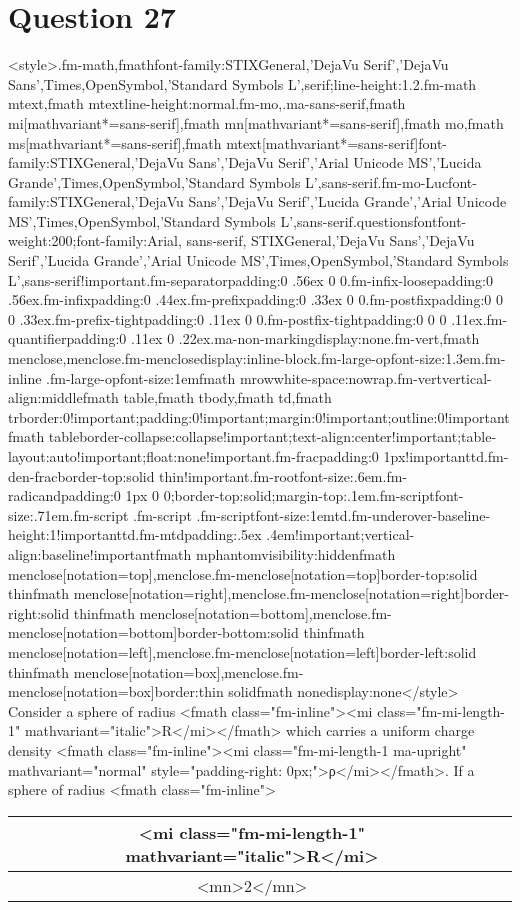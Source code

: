 \documentclass{article}
\begin{document}
\section*{Question 27}
<style>.fm-math,fmath{font-family:STIXGeneral,'DejaVu Serif','DejaVu Sans',Times,OpenSymbol,'Standard Symbols L',serif;line-height:1.2}.fm-math mtext,fmath mtext{line-height:normal}.fm-mo,.ma-sans-serif,fmath mi[mathvariant*=sans-serif],fmath mn[mathvariant*=sans-serif],fmath mo,fmath ms[mathvariant*=sans-serif],fmath mtext[mathvariant*=sans-serif]{font-family:STIXGeneral,'DejaVu Sans','DejaVu Serif','Arial Unicode MS','Lucida Grande',Times,OpenSymbol,'Standard Symbols L',sans-serif}.fm-mo-Luc{font-family:STIXGeneral,'DejaVu Sans','DejaVu Serif','Lucida Grande','Arial Unicode MS',Times,OpenSymbol,'Standard Symbols L',sans-serif}.questionsfont{font-weight:200;font-family:Arial, sans-serif, STIXGeneral,'DejaVu Sans','DejaVu Serif','Lucida Grande','Arial Unicode MS',Times,OpenSymbol,'Standard Symbols L',sans-serif!important}.fm-separator{padding:0 .56ex 0 0}.fm-infix-loose{padding:0 .56ex}.fm-infix{padding:0 .44ex}.fm-prefix{padding:0 .33ex 0 0}.fm-postfix{padding:0 0 0 .33ex}.fm-prefix-tight{padding:0 .11ex 0 0}.fm-postfix-tight{padding:0 0 0 .11ex}.fm-quantifier{padding:0 .11ex 0 .22ex}.ma-non-marking{display:none}.fm-vert,fmath menclose,menclose.fm-menclose{display:inline-block}.fm-large-op{font-size:1.3em}.fm-inline .fm-large-op{font-size:1em}fmath mrow{white-space:nowrap}.fm-vert{vertical-align:middle}fmath table,fmath tbody,fmath td,fmath tr{border:0!important;padding:0!important;margin:0!important;outline:0!important}fmath table{border-collapse:collapse!important;text-align:center!important;table-layout:auto!important;float:none!important}.fm-frac{padding:0 1px!important}td.fm-den-frac{border-top:solid thin!important}.fm-root{font-size:.6em}.fm-radicand{padding:0 1px 0 0;border-top:solid;margin-top:.1em}.fm-script{font-size:.71em}.fm-script .fm-script .fm-script{font-size:1em}td.fm-underover-base{line-height:1!important}td.fm-mtd{padding:.5ex .4em!important;vertical-align:baseline!important}fmath mphantom{visibility:hidden}fmath menclose[notation=top],menclose.fm-menclose[notation=top]{border-top:solid thin}fmath menclose[notation=right],menclose.fm-menclose[notation=right]{border-right:solid thin}fmath menclose[notation=bottom],menclose.fm-menclose[notation=bottom]{border-bottom:solid thin}fmath menclose[notation=left],menclose.fm-menclose[notation=left]{border-left:solid thin}fmath menclose[notation=box],menclose.fm-menclose[notation=box]{border:thin solid}fmath none{display:none}</style> Consider a sphere of radius <fmath class="fm-inline"><mi class="fm-mi-length-1" mathvariant="italic">R</mi></fmath> which carries a uniform charge density <fmath class="fm-inline"><mi class="fm-mi-length-1 ma-upright" mathvariant="normal" style="padding-right: 0px;">ρ</mi></fmath>. If a sphere of radius <fmath class="fm-inline">\begin{tabular}{|c|c|}
\hline
<mi class="fm-mi-length-1" mathvariant="italic">R</mi> \\
\hline
<mn>2</mn> \\
\hline
\end{tabular}
\end{document}

